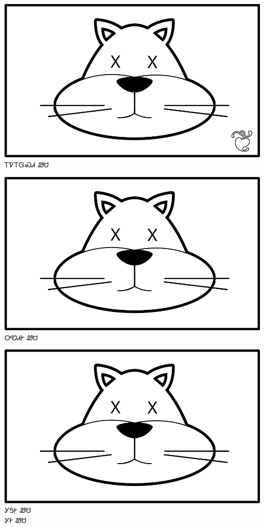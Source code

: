\documentclass[avery5371]{flashcards}%
\begin{document}
\begin{flashcard}{
\includegraphics[width=0.95\columnwidth,height=.51\columnwidth,keepaspectratio]{../artwork/for-colors/wesa-dead-with-leaf}
}\Huge ᎢᏤᎢᏳᏍᏗ ᏪᏌ
\end{flashcard}

\begin{flashcard}{
\includegraphics[width=0.95\columnwidth,height=.51\columnwidth,keepaspectratio]{../artwork/for-colors/wesa-dead}
}\Huge ᎤᏬᏗᎨ ᏪᏌ
\end{flashcard}

\begin{flashcard}{
\includegraphics[width=0.95\columnwidth,height=.51\columnwidth,keepaspectratio]{../artwork/for-colors/wesa-dead}
}\Huge ᎩᎦᎨ ᏪᏌ\\ᎩᎨ ᏪᏌ
\end{flashcard}
\end{document}
